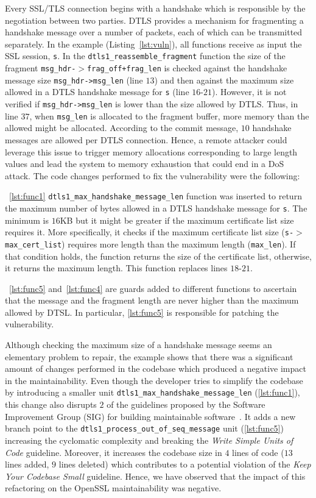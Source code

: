 \documentclass[10pt,conference]{IEEEtran}
\begin{document}
Every SSL/TLS connection begins with a handshake which is responsible by the
negotiation between two parties. DTLS provides a mechanism for fragmenting a
handshake message over a number of packets, each of which can be transmitted
separately. In the example (Listing~\ref{lst:vuln}), all functions receive as
input the SSL session, \texttt{s}. In the \texttt{dtls1\_reassemble\_fragment}
function the size of the fragment \texttt{msg\_hdr-$>$frag\_off+frag\_len} is
checked against the handshake message size \texttt{msg\_hdr->msg\_len} (line
$13$) and then against the maximum size allowed in a DTLS handshake message for \texttt{s} (line $16$-$21$). However, it is not verified if \texttt{msg\_hdr->msg\_len} is lower than the size allowed by DTLS. Thus, in line
$37$, when \texttt{msg\_len} is allocated to the fragment buffer, more memory
than the allowed might be allocated. According to the commit message, $10$
handshake messages are allowed per DTLS connection. Hence, a remote attacker
could leverage this issue to trigger memory allocations corresponding to large
length values and lead the system to memory exhaustion that could end in a DoS
attack. The code changes performed to fix the vulnerability were the following:

~\ref{lst:func1} \texttt{dtls1\_max\_handshake\_message\_len} function was
inserted to return the maximum number of bytes allowed in a DTLS
handshake message for \texttt{s}. The minimum is $16$KB but it might be greater if the maximum certificate list size requires it. More
specifically, it checks if the maximum certificate list size
(\texttt{s-$>$max\_cert\_list}) requires more length than the maximum length
(\texttt{max\_len}). If that condition holds, the function returns the size of
the certificate list, otherwise, it returns the maximum length. This function
replaces lines $18$-$21$.

~\ref{lst:func5} and~\ref{lst:func4} are guards added to different functions to
ascertain that the message and the fragment length are never higher than the
maximum allowed by DTSL. In particular, \ref{lst:func5} is responsible for patching
the vulnerability.

Although checking the maximum size of a handshake message seems an elementary
problem to repair, the example shows that there was a significant amount of
changes performed in the codebase which produced a negative impact in the
maintainability. Even though the developer tries to simplify the
codebase by introducing a smaller unit
\texttt{dtls1\_max\_handshake\_message\_len} (\ref{lst:func1}), this change also
disrupts $2$ of the guidelines proposed by the Software Improvement Group (SIG) for
building maintainable software~\cite{Visser:2016:OREILLY}. It adds a new branch
point to the \texttt{dtls1\_process\_out\_of\_seq\_message} unit
(\ref{lst:func5}) increasing the cyclomatic complexity and breaking the
\emph{Write Simple Units of Code} guideline. Moreover, it increases the codebase
size in $4$ lines of code ($13$ lines added, $9$ lines deleted) which
contributes to a potential violation of the \emph{Keep Your Codebase Small}
guideline. Hence, we have observed that the impact of this refactoring on the
OpenSSL maintainability was negative.
\end{document}
